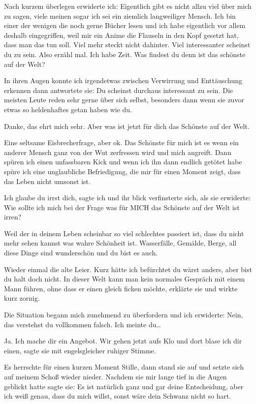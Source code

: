 \documentclass[11pt, a5paper]{article}
\begin{document}
\begin{spacing}{1.2}
		Nach kurzem überlegen erwiderte ich: \frqq Eigentlich gibt es nicht allzu viel über mich zu sagen, viele meinen sogar ich sei ein ziemlich langweiliger Mensch. Ich bin einer der wenigen die noch gerne Bücher lesen und ich habe eigentlich vor allem deshalb eingegriffen, weil mir ein Anime die Flauseln in den Kopf gesetzt hat, dass man das tun soll. Viel mehr steckt nicht dahinter. Viel interessanter scheinst du zu sein. Also erzähl mal. Ich habe Zeit. Was findest du denn ist das schönste auf der Welt?\flqq
		
		In ihren Augen konnte ich irgendetwas zwischen Verwirrung und Enttäuschung erkennen dann antwortete sie: \frqq Du scheinst durchaus interessant zu sein. Die meisten Leute reden sehr gerne über sich selbst, besonders dann wenn sie zuvor etwas so heldenhaftes getan haben wie du.\flqq
		
		\frqq Danke, das ehrt mich sehr. Aber was ist jetzt für dich das Schönste auf der Welt.\flqq
		
		\frqq Eine seltsame Eisbrecherfrage, aber ok. Das Schönste für mich ist es wenn ein anderer Mensch ganz von der Wut zerfressen wird und mich angreift. Dann spüren ich einen unfassbaren Kick und wenn ich ihn dann endlich getötet habe spüre ich eine unglaubliche Befriedigung, die mir für einen Moment zeigt, dass das Leben nicht umsonst ist.\flqq
		
		\frqq Ich glaube du irrst dich\flqq , sagte ich und ihr blick verfinsterte sich, als sie erwiderte: \frqq Wie sollte ich mich bei der Frage was für MICH das Schönste auf der Welt ist irren?\flqq
		
		\frqq Weil der in deinem Leben scheinbar so viel schlechtes passiert ist, dass du nicht mehr sehen kannst was wahre Schönheit ist. Wasserfälle, Gemälde, Berge, all diese Dinge sind wunderschön und du bist es auch.\flqq
		
		\frqq Wieder einmal die alte Leier. Kurz hätte ich befürchtet du wärst anders, aber bist du halt doch nicht. In dieser Welt kann man kein normales Gespräch mit einem Mann führen, ohne dass er einen gleich ficken möchte\flqq , erklärte sie und wirkte kurz zornig.
		
		Die Situation begann mich zunehmend zu überfordern und ich erwiderte: \frqq Nein, das verstehst du vollkommen falsch. Ich meinte du…\flqq
		
		\frqq Ja. Ich mache dir ein Angebot. Wir gehen jetzt aufs Klo und dort blase ich dir einen\flqq , sagte sie mit engelsgleicher ruhiger Stimme.
		
		Es herrschte für einen kurzen Moment Stille, dann stand sie auf und setzte sich auf meinem Schoß wieder nieder. Nachdem sie mir lange tief in die Augen geblickt hatte sagte sie: \frqq Es ist natürlich ganz und gar deine Entscheidung, aber ich weiß genau, dass du mich willst, sonst wäre dein Schwanz nicht so hart.\flqq
		

\end{spacing}
\end{document}
